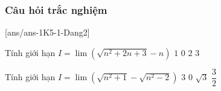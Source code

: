 \subsubsection{Câu hỏi trắc nghiệm}
[ans/ans-1K5-1-Dang2]
\begin{ex}%
	Tính giới hạn $I = \lim \left(\sqrt{n^2 + 2n + 3} - n\right)$
	\choice
	{\True $1$}
	{$0$}
	{$2$}
	{$3$}
\end{ex}
\begin{ex}%
	Tính giới hạn $I = \lim \left(\sqrt{n^2 + 1} - \sqrt{n^2 - 2}\right)$
	\choice
	{$3$}
	{\True $0$}
	{$\sqrt{3}$}
	{$\dfrac{3}{2}$}
\end{ex}

